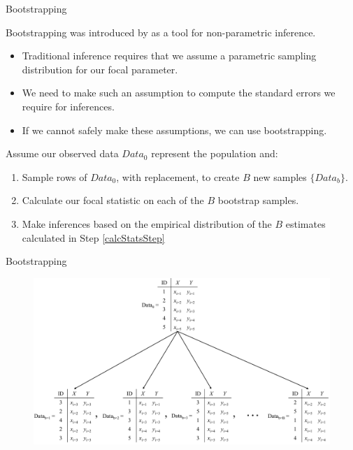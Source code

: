 \documentclass{beamer}
\newcommand{\va}[0]{\vspace{12pt}}
\newcommand{\vb}[0]{\vspace{6pt}}
\begin{document}
\begin{frame}[shrink = 5]{Bootstrapping}
  
  Bootstrapping was introduced by \citet{efron:1979} as a tool for
  non-parametric inference.
  \vb
  \begin{itemize}
    \item Traditional inference requires that we assume a parametric
      sampling distribution for our focal parameter.
      \vb
    \item We need to make such an assumption to compute the standard
      errors we require for inferences.
      \vb
    \item If we cannot safely make these assumptions, we can use
      bootstrapping.
  \end{itemize}
  \va
  Assume our observed data $Data_0$ represent the population and:
  \vb
  \begin{enumerate}
    \item Sample rows of $Data_0$, with replacement, to create $B$ new
      samples $\{Data_b\}$.
      \vb
    \item Calculate our focal statistic on each of the $B$ bootstrap
      samples. \label{calcStatsStep}
      \vb
    \item Make inferences based on the empirical distribution of the
      $B$ estimates calculated in Step \ref{calcStatsStep}
  \end{enumerate}
  
\end{frame}



\begin{frame}{Bootstrapping}
  
  \begin{figure}
    \begin{center}
      \includegraphics[width=\textwidth]{figures/bootstrappingDiagram.pdf}
    \end{center}
  \end{figure}
  
\end{frame}
\end{document}
